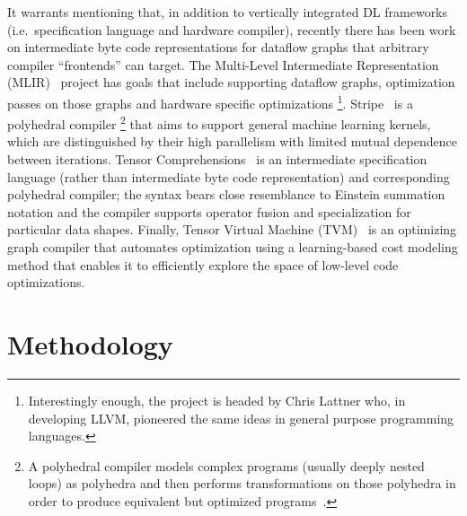 \documentclass[sigconf]{acmart}
\begin{document}
It warrants mentioning that, in addition to vertically integrated DL frameworks (i.e.\ specification language and hardware compiler), recently there has been work on intermediate byte code representations for dataflow graphs that arbitrary compiler ``frontends'' can target.
The Multi-Level Intermediate Representation (MLIR)~\cite{lattner2020mlir} project has goals that include supporting dataflow graphs, optimization passes on those graphs and hardware specific optimizations%
\footnote{Interestingly enough, the project is headed by Chris Lattner who, in developing LLVM, pioneered the same ideas in general purpose programming languages.}.
Stripe~\cite{zerrell2019stripe} is a polyhedral compiler%
\footnote{A polyhedral compiler models complex programs (usually deeply nested loops) as polyhedra and then performs transformations on those polyhedra in order to produce equivalent but optimized programs~\cite{Griebl98codegeneration}.}
that aims to support general machine learning kernels, which are distinguished by their high parallelism with limited mutual dependence between iterations.
Tensor Comprehensions~\cite{vasilache2018tensor} is an intermediate specification language (rather than intermediate byte code representation) and corresponding polyhedral compiler;
the syntax bears close resemblance to Einstein summation notation and the compiler supports operator fusion and specialization for particular data shapes.
Finally, Tensor Virtual Machine (TVM)~\cite{10.5555/3291168.3291211} is an optimizing graph compiler that automates optimization using a learning-based cost modeling method that enables it to efficiently explore the space of low-level code optimizations.

\section{Methodology}\label{sec:methodology}
\end{document}
